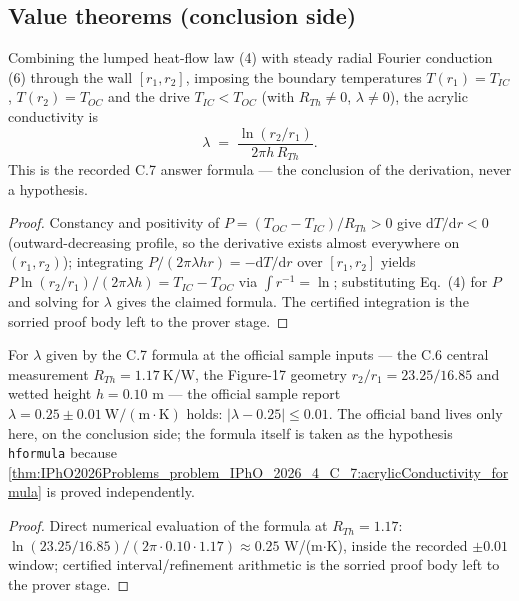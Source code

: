 \subsection*{Value theorems (conclusion side)}

\begin{theorem}
\label{thm:IPhO2026Problems_problem_IPhO_2026_4_C_7:acrylicConductivity_formula}
Combining the lumped heat-flow law (4) with steady radial Fourier
conduction (6) through the wall $[r_1, r_2]$, imposing the boundary
temperatures $T(r_1) = T_{IC}$, $T(r_2) = T_{OC}$ and the drive
$T_{IC} < T_{OC}$ (with $R_{Th} \ne 0$, $\lambda \ne 0$), the acrylic
conductivity is
\[ \lambda \;=\; \frac{\ln(r_2/r_1)}{2\pi h\,R_{Th}}. \]
This is the recorded C.7 answer formula --- the conclusion of the
derivation, never a hypothesis.
\end{theorem}
\begin{proof}
Constancy and positivity of $P = (T_{OC}-T_{IC})/R_{Th} > 0$ give
$\mathrm{d}T/\mathrm{d}r < 0$ (outward-decreasing profile, so the
derivative exists almost everywhere on $(r_1, r_2)$); integrating
$P/(2\pi\lambda h r) = -\mathrm{d}T/\mathrm{d}r$ over $[r_1, r_2]$ yields
$P\ln(r_2/r_1)/(2\pi\lambda h) = T_{IC} - T_{OC}$ via
$\int r^{-1} = \ln$; substituting Eq.\ (4) for $P$ and solving for
$\lambda$ gives the claimed formula. The certified integration is the
sorried proof body left to the prover stage.
\end{proof}

\begin{theorem}
\label{thm:IPhO2026Problems_problem_IPhO_2026_4_C_7:acrylicConductivity_officialSample}
For $\lambda$ given by the C.7 formula at the official sample inputs ---
the C.6 central measurement $R_{Th} = 1.17\ \mathrm{K/W}$, the Figure-17
geometry $r_2/r_1 = 23.25/16.85$ and wetted height $h = 0.10$
m --- the official sample report
$\lambda = 0.25 \pm 0.01\ \mathrm{W/(m\cdot K)}$ holds:
$\lvert \lambda - 0.25 \rvert \le 0.01$. The official band lives only
here, on the conclusion side; the formula itself is taken as the
hypothesis \texttt{hformula} because
\cref{thm:IPhO2026Problems_problem_IPhO_2026_4_C_7:acrylicConductivity_formula}
is proved independently.
\end{theorem}
\begin{proof}
Direct numerical evaluation of the formula at $R_{Th} = 1.17$:
$\ln(23.25/16.85)/(2\pi \cdot 0.10 \cdot 1.17) \approx 0.25$
W/(m$\cdot$K), inside the recorded $\pm 0.01$ window; certified
interval/refinement arithmetic is the sorried proof body left to the
prover stage.
\end{proof}

